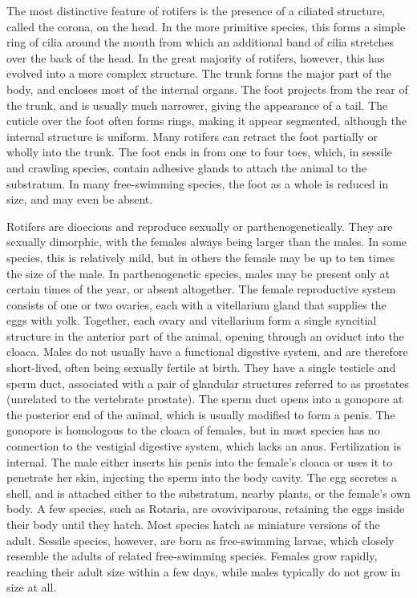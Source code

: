 The most distinctive feature of rotifers is the presence of a ciliated
structure, called the corona, on the head. In the more primitive
species, this forms a simple ring of cilia around the mouth from which
an additional band of cilia stretches over the back of the head. In the
great majority of rotifers, however, this has evolved into a more
complex structure. The trunk forms the major part of the body, and
encloses most of the internal organs. The foot projects from the rear of
the trunk, and is usually much narrower, giving the appearance of a
tail. The cuticle over the foot often forms rings, making it appear
segmented, although the internal structure is uniform. Many rotifers can
retract the foot partially or wholly into the trunk. The foot ends in
from one to four toes, which, in sessile and crawling species, contain
adhesive glands to attach the animal to the substratum. In many
free-swimming species, the foot as a whole is reduced in size, and may
even be absent.

Rotifers are dioecious and reproduce sexually or parthenogenetically.
They are sexually dimorphic, with the females always being larger than
the males. In some species, this is relatively mild, but in others the
female may be up to ten times the size of the male. In parthenogenetic
species, males may be present only at certain times of the year, or
absent altogether. The female reproductive system consists of one or two
ovaries, each with a vitellarium gland that supplies the eggs with yolk.
Together, each ovary and vitellarium form a single syncitial structure
in the anterior part of the animal, opening through an oviduct into the
cloaca. Males do not usually have a functional digestive system, and are
therefore short-lived, often being sexually fertile at birth. They have
a single testicle and sperm duct, associated with a pair of glandular
structures referred to as prostates (unrelated to the vertebrate
prostate). The sperm duct opens into a gonopore at the posterior end of
the animal, which is usually modified to form a penis. The gonopore is
homologous to the cloaca of females, but in most species has no
connection to the vestigial digestive system, which lacks an anus.
Fertilization is internal. The male either inserts his penis into the
female's cloaca or uses it to penetrate her skin, injecting the sperm
into the body cavity. The egg secretes a shell, and is attached either
to the substratum, nearby plants, or the female's own body. A few
species, such as Rotaria, are ovoviviparous, retaining the eggs inside
their body until they hatch. Most species hatch as miniature versions of
the adult. Sessile species, however, are born as free-swimming larvae,
which closely resemble the adults of related free-swimming species.
Females grow rapidly, reaching their adult size within a few days, while
males typically do not grow in size at all.

